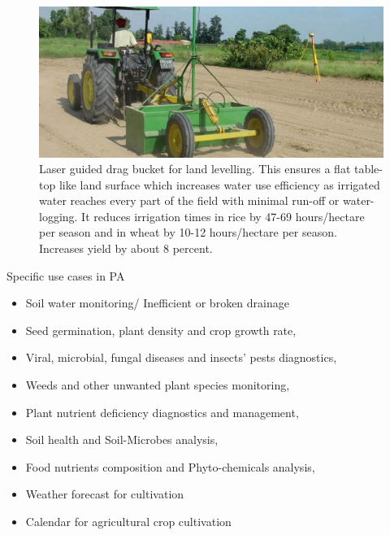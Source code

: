 \documentclass[11pt,dvipsnames,ignorenonframetext,aspectratio=169]{beamer}
\providecommand{\tightlist}{%
  \setlength{\itemsep}{0pt}\setlength{\parskip}{0pt}}
\begin{document}
\begin{frame}{}
\protect\hypertarget{section-6}{}
\begin{figure}
\includegraphics[width=0.45\linewidth]{../images/Laser_land_leveller} \caption{Laser guided drag bucket for land levelling. This ensures a flat table-top like land surface which increases water use efficiency as irrigated water reaches every part of the field with minimal run-off or water-logging. It reduces irrigation times in rice by 47-69 hours/hectare per season and in wheat by 10-12 hours/hectare per season. Increases yield by about 8 percent.}\label{fig:laser-land-leveler}
\end{figure}
\end{frame}

\begin{frame}{Specific use cases in PA}
\protect\hypertarget{specific-use-cases-in-pa}{}
\begin{itemize}
\tightlist
\item
  Soil water monitoring/ Inefficient or broken drainage
\item
  Seed germination, plant density and crop growth rate,
\item
  Viral, microbial, fungal diseases and insects' pests diagnostics,
\item
  Weeds and other unwanted plant species monitoring,
\item
  Plant nutrient deficiency diagnostics and management,
\item
  Soil health and Soil-Microbes analysis,
\item
  Food nutrients composition and Phyto-chemicals analysis,
\item
  Weather forecast for cultivation
\item
  Calendar for agricultural crop cultivation
\end{itemize}
\end{frame}
\end{document}
